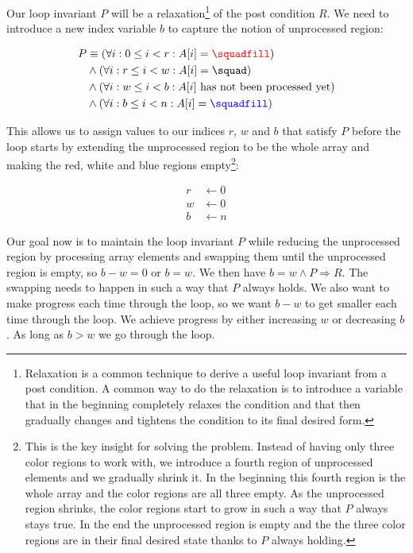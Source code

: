Our loop invariant $P$ will be a relaxation\footnote{Relaxation is a common technique to derive a useful loop invariant from a post condition. A common way to do the relaxation is to introduce a variable that in the beginning completely relaxes the condition and that then gradually changes and tightens the condition to its final desired form.} of the post condition $R$. We need to introduce a new index variable $b$ to capture the notion of unprocessed region:

\begin{align*}
P & \equiv (\forall i: 0 \leq i < r: A[i] = {\color{red} \squadfill}) \\
  & \wedge (\forall i: r \leq i < w: A[i] = \squad) \\
  & \wedge (\forall i: w \leq i < b: A[i]  \text{ has not been processed yet}) \\
  & \wedge (\forall i: b \leq i < n: A[i] = {\color{blue} \squadfill})
\end{align*}

This allows us to assign values to our indices $r$, $w$ and $b$ that satisfy $P$ before the loop starts by extending the unprocessed region to be the whole array and making the red, white and blue regions empty\footnote{This is the key insight for solving the problem. Instead of having only three color regions to work with, we introduce a fourth region of unprocessed elements and we gradually shrink it. In the beginning this fourth region is the whole array and the color regions are all three empty. As the unprocessed region shrinks, the color regions start to grow in such a way that $P$ always stays true. In the end the unprocessed region is empty and the the three color regions are in their final desired state thanks to $P$ always holding.}:

\begin{align*}
r & \leftarrow 0 \\
w & \leftarrow 0 \\
b & \leftarrow n
\end{align*}

Our goal now is to maintain the loop invariant $P$ while reducing the unprocessed region by processing array elements and swapping them until the unprocessed region is empty, so $b - w = 0$ or $b = w$. We then have $b = w \wedge P \Rightarrow R$. The swapping needs to happen in such a way that $P$ always holds. We also want to make progress each time through the loop, so we want $b - w$ to get smaller each time through the loop. We achieve progress by either increasing $w$ or decreasing $b$. As long as $b > w$ we go through the loop.

